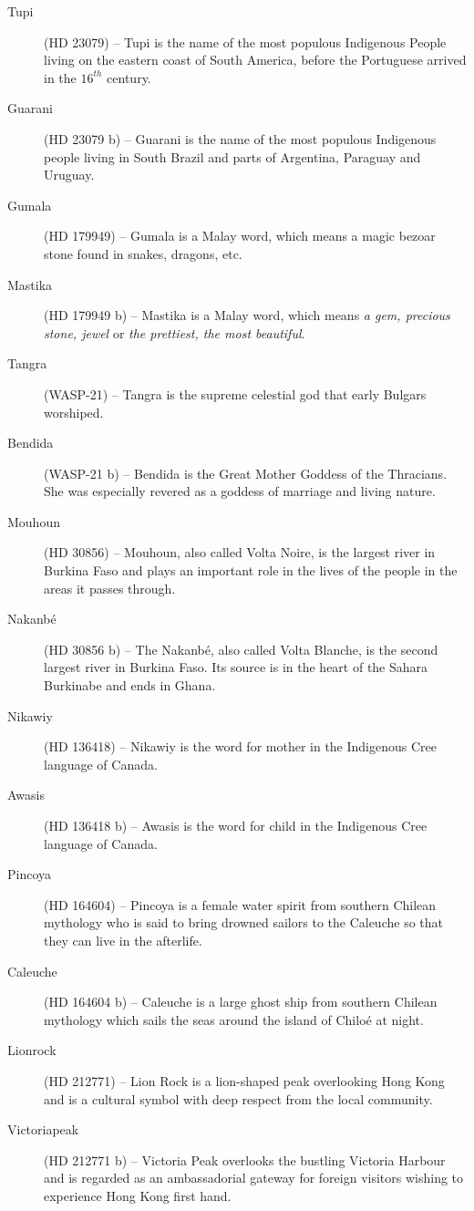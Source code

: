\begin{description}
\item[Tupi] (HD 23079) -- Tupi is the name of the most populous Indigenous People living on the eastern coast of South America, before the Portuguese arrived in the $16^{th}$ century.
\item[Guarani] (HD 23079 b) -- Guarani is the name of the most populous Indigenous people living in South Brazil and parts of Argentina, Paraguay and Uruguay.
\item[Gumala] (HD 179949) -- Gumala is a Malay word, which means a magic bezoar stone found in snakes, dragons, etc.
\item[Mastika] (HD 179949 b) -- Mastika is a Malay word, which means \textit{a gem, precious stone, jewel} or \textit{the prettiest, the most beautiful}.
\item[Tangra] (WASP-21) -- Tangra is the supreme celestial god that early Bulgars worshiped.
\item[Bendida] (WASP-21 b) -- Bendida is the Great Mother Goddess of the Thracians. She was especially revered as a goddess of marriage and living nature.
\item[Mouhoun] (HD 30856) -- Mouhoun, also called Volta Noire, is the largest river in Burkina Faso and plays an important role in the lives of the people in the areas it passes through.
\item[Nakanbé] (HD 30856 b) -- The Nakanbé, also called Volta Blanche, is the second largest river in Burkina Faso. Its source is in the heart of the Sahara Burkinabe and ends in Ghana.
\item[Nikawiy] (HD 136418) -- Nikawiy is the word for mother in the Indigenous Cree language of Canada.
\item[Awasis] (HD 136418 b) -- Awasis is the word for child in the Indigenous Cree language of Canada.
\item[Pincoya] (HD 164604) -- Pincoya is a female water spirit from southern Chilean mythology who is said to bring drowned sailors to the Caleuche so that they can live in the afterlife.
\item[Caleuche] (HD 164604 b) -- Caleuche is a large ghost ship from southern Chilean mythology which sails the seas around the island of Chiloé at night.
\item[Lionrock] (HD 212771) -- Lion Rock is a lion-shaped peak overlooking Hong Kong and is a cultural symbol with deep respect from the local community.
\item[Victoriapeak] (HD 212771 b) -- Victoria Peak overlooks the bustling Victoria Harbour and is regarded as an ambassadorial gateway for foreign visitors wishing to experience Hong Kong first hand.

\end{description}
